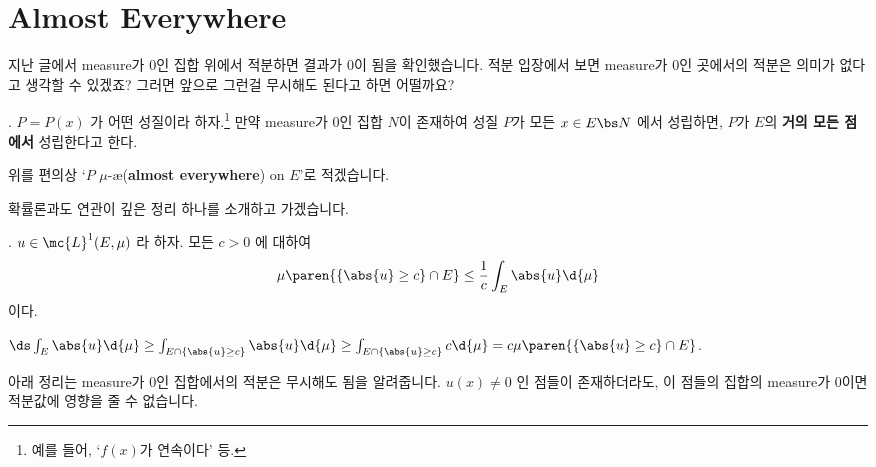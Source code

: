\begin{center}
\end{center}

\section*{Almost Everywhere}

지난 글에서 measure가 0인 집합 위에서 적분하면 결과가 0이 됨을 확인했습니다. 적분 입장에서 보면 measure가 0인 곳에서의 적분은 의미가 없다고 생각할 수 있겠죠? 그러면 앞으로 그런걸 무시해도 된다고 하면 어떨까요?

.  \(P = P(x)\) 가 어떤 성질이라 하자.\footnote{예를 들어, `\(f(x)\)가 연속이다' 등.} 만약 measure가 0인 집합 \(N\)이 존재하여 성질 \(P\)가 모든 \(x \in E \bs N\) 에서 성립하면, \(P\)가 \(E\)의 \textbf{거의 모든 점에서} 성립한다고 한다.

\notation 위를 편의상 `\(P\) \(\mu\)-\ae (\textbf{almost everywhere}) on \(E\)'로 적겠습니다.

확률론과도 연관이 깊은 정리 하나를 소개하고 가겠습니다.

\thm.  \(u \in \mc{L}^{1}(E, \mu)\) 라 하자. 모든 \(c > 0\) 에 대하여
\[
    \mu\paren{\{\abs{u} \geq c\} \cap E} \leq \frac{1}{c} \int_E \abs{u} \d{\mu}
\]
이다.

\pf \(\ds \int_E \abs{u} \d{\mu} \geq \int_{E\cap \{\abs{u}\geq c\}} \abs{u} \d{\mu} \geq \int_{E\cap \{\abs{u}\geq c\}} c \d{\mu} = c \mu\paren{\{\abs{u} \geq c\} \cap E}\).

아래 정리는 measure가 0인 집합에서의 적분은 무시해도 됨을 알려줍니다. \(u(x) \neq 0\) 인 점들이 존재하더라도, 이 점들의 집합의 measure가 0이면 적분값에 영향을 줄 수 없습니다.

